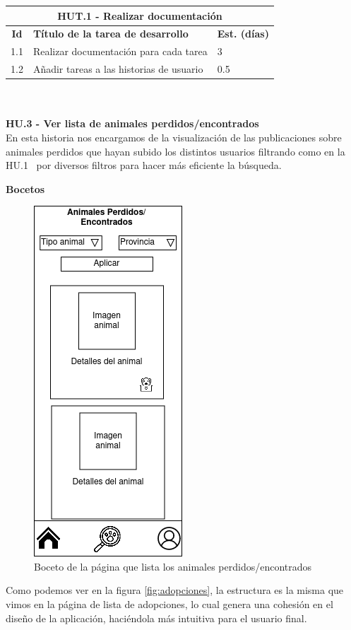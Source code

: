 \begin{tabular}{|c|p{9.5cm}|p{1cm}|}
	\hline
	\multicolumn{3}{|c|}{\textbf{HUT.1 - Realizar documentación}} \\
	\hline
	\textbf{Id} & \textbf{Título de la tarea de desarrollo} & \textbf{Est. (días)} \\
	\hline
	1.1 & Realizar documentación para cada tarea & 3 \\ \hline
	1.2 &  Añadir tareas a las historias de usuario & 0.5 \\ \hline
\end{tabular} \\ \\

\Large{\textbf{HU.3 - Ver lista de animales perdidos/encontrados}} \\

En esta historia nos encargamos de la visualización de las publicaciones sobre animales perdidos que hayan subido los distintos usuarios filtrando como en la HU.1~\pageref{sec:hu1} por diversos filtros para hacer más eficiente la búsqueda.

\textbf{Bocetos}

\begin{figure}[h]
	\centering
	\includegraphics[width=0.31\linewidth]{"sprint 2/hu3/listaPerdidos"}
	\caption{Boceto de la página que lista los animales perdidos/encontrados}
	\label{fig:listaperdidos}
\end{figure}

Como podemos ver en la figura \ref{fig:adopciones}, la estructura es la misma que vimos en la página de lista de adopciones, lo cual genera una cohesión en el diseño de la aplicación, haciéndola más intuitiva para el usuario final.


